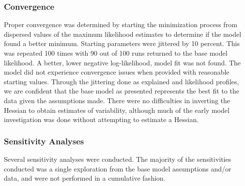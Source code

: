 \documentclass[11pt,
  english,
  a4paper,
]{article}
\begin{document}
\hypertarget{convergence}{%
\subsubsection{Convergence}\label{convergence}}

\leavevmode\tagmcend\tagstructend


Proper convergence was determined by starting the minimization process from dispersed values of the maximum likelihood estimates to determine if the model found a better minimum. Starting parameters were jittered by 10 percent. This was repeated 100 times with 90 out of 100 runs returned to the base model likelihood. A better, lower negative log-likelihood, model fit was not found. The model did not experience convergence issues when provided with reasonable starting values. Through the jittering done as explained and likelihood profiles, we are confident that the base model as presented represents the best fit to the data given the assumptions made. There were no difficulties in inverting the Hessian to obtain estimates of variability, although much of the early model investigation was done without attempting to estimate a Hessian.

\leavevmode\tagmcend\tagstructend\par


\hypertarget{sensitivities}{%
\subsubsection{Sensitivity Analyses}\label{sensitivities}}

\leavevmode\tagmcend\tagstructend


Several sensitivity analyses were conducted. The majority of the sensitivities conducted was a single exploration from the base model assumptions and/or data, and were not performed in a cumulative fashion.

\leavevmode\tagmcend\tagstructend\par
\end{document}
